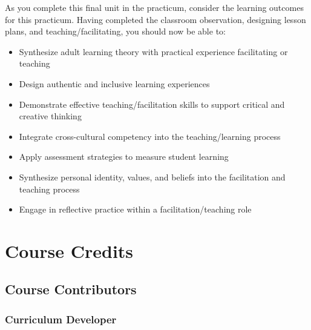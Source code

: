 \documentclass[
]{book}
\providecommand{\tightlist}{%
  \setlength{\itemsep}{0pt}\setlength{\parskip}{0pt}}
\begin{document}
\begin{progress}
As you complete this final unit in the practicum, consider the learning outcomes for this practicum. Having completed the classroom observation, designing lesson plans, and teaching/facilitating, you should now be able to:

\begin{itemize}
\tightlist
\item
  Synthesize adult learning theory with practical experience facilitating or teaching\\
\item
  Design authentic and inclusive learning experiences\\
\item
  Demonstrate effective teaching/facilitation skills to support critical and creative thinking\\
\item
  Integrate cross-cultural competency into the teaching/learning process\\
\item
  Apply assessment strategies to measure student learning\\
\item
  Synthesize personal identity, values, and beliefs into the facilitation and teaching process\\
\item
  Engage in reflective practice within a facilitation/teaching role
\end{itemize}
\end{progress}

\hypertarget{course-credits}{%
\chapter*{Course Credits}\label{course-credits}}

\hypertarget{course-contributors}{%
\section*{Course Contributors}\label{course-contributors}}

\hypertarget{curriculum-developer}{%
\subsection*{Curriculum Developer}\label{curriculum-developer}}
\end{document}
